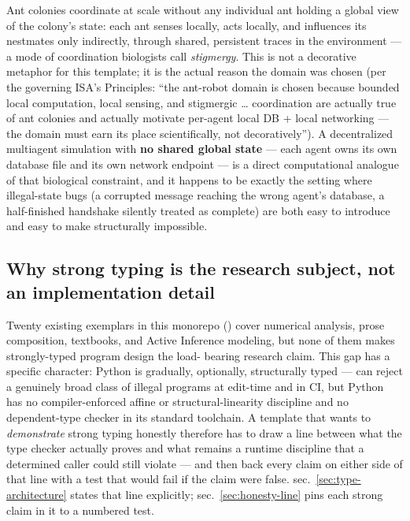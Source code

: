 \documentclass[
  english,
]{article}
\newcounter{none} %
\theoremstyle{definition}
\begin{document}
Ant colonies coordinate at scale without any individual ant holding a
global view of the colony's state: each ant senses locally, acts
locally, and influences its nestmates only indirectly, through shared,
persistent traces in the environment --- a mode of coordination
biologists call \emph{stigmergy}. This is not a decorative metaphor for
this template; it is the actual reason the domain was chosen (per the
governing ISA's Principles: ``the ant-robot domain is chosen because
bounded local computation, local sensing, and stigmergic \ldots{}
coordination are actually true of ant colonies and actually motivate
per-agent local DB + local networking --- the domain must earn its place
scientifically, not decoratively''). A decentralized multiagent
simulation with \textbf{no shared global state} --- each agent owns its
own database file and its own network endpoint --- is a direct
computational analogue of that biological constraint, and it happens to
be exactly the setting where illegal-state bugs (a corrupted message
reaching the wrong agent's database, a half-finished handshake silently
treated as complete) are both easy to introduce and easy to make
structurally impossible.

\subsection{Why strong typing is the research subject, not an
implementation
detail}\label{why-strong-typing-is-the-research-subject-not-an-implementation-detail}

Twenty existing exemplars in this monorepo
() cover numerical analysis, prose
composition, textbooks, and Active Inference modeling, but none of them
makes strongly-typed program design the load- bearing research claim.
This gap has a specific character: Python is gradually, optionally,
structurally typed ---  can reject a genuinely
broad class of illegal programs at edit-time and in CI, but Python has
no compiler-enforced affine or structural-linearity discipline and no
dependent-type checker in its standard toolchain. A template that wants
to \emph{demonstrate} strong typing honestly therefore has to draw a
line between what the type checker actually proves and what remains a
runtime discipline that a determined caller could still violate --- and
then back every claim on either side of that line with a test that would
fail if the claim were false. sec.~\ref{sec:type-architecture} states
that line explicitly; sec.~\ref{sec:honesty-line} pins each strong claim
in it to a numbered test.
\end{document}
